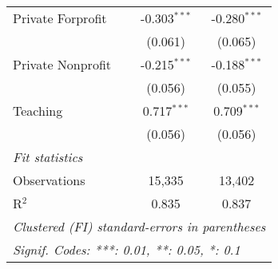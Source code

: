 \begin{tabular}{lcc}
    Private Forprofit      & -0.303$^{***}$             & -0.280$^{***}$     \\
                           & (0.061)                    & (0.065)            \\
    Private Nonprofit      & -0.215$^{***}$             & -0.188$^{***}$     \\
                           & (0.056)                    & (0.055)            \\
    Teaching               & 0.717$^{***}$              & 0.709$^{***}$      \\
                           & (0.056)                    & (0.056)            \\
    \midrule
    \emph{Fit statistics}                                                    \\
    Observations           & 15,335                     & 13,402             \\
    R$^2$                  & 0.835                      & 0.837              \\
    \midrule \midrule
    \multicolumn{3}{l}{\emph{Clustered (FI) standard-errors in parentheses}} \\
    \multicolumn{3}{l}{\emph{Signif. Codes: ***: 0.01, **: 0.05, *: 0.1}}    \\
\end{tabular}
\par\endgroup

